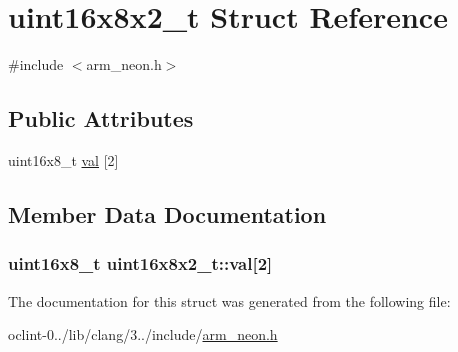 \hypertarget{structuint16x8x2__t}{\section{uint16x8x2\-\_\-t Struct Reference}
\label{structuint16x8x2__t}
}


{\ttfamily \#include $<$arm\-\_\-neon.\-h$>$}

\subsection*{Public Attributes}
\begin{DoxyCompactItemize}
\item 
uint16x8\-\_\-t \hyperlink{structuint16x8x2__t_aefbebf4d19c86b12c892fa35fce3c365}{val} \mbox{[}2\mbox{]}
\end{DoxyCompactItemize}


\subsection{Member Data Documentation}
\hypertarget{structuint16x8x2__t_aefbebf4d19c86b12c892fa35fce3c365}{
\subsubsection[{val}]{\setlength{\rightskip}{0pt plus 5cm}uint16x8\-\_\-t uint16x8x2\-\_\-t\-::val\mbox{[}2\mbox{]}}}\label{structuint16x8x2__t_aefbebf4d19c86b12c892fa35fce3c365}


The documentation for this struct was generated from the following file\-:\begin{DoxyCompactItemize}
\item 
oclint-\/0../lib/clang/3../include/\hyperlink{arm__neon_8h}{arm\-\_\-neon.\-h}\end{DoxyCompactItemize}
